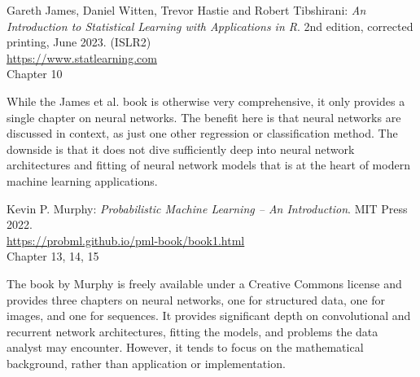 \begin{resourcebox}
Gareth James, Daniel Witten, Trevor Hastie and Robert Tibshirani: \emph{An Introduction to Statistical Learning with Applications in R}. 2nd edition, corrected printing, June 2023. (ISLR2) \\

\small\url{https://www.statlearning.com}\normalsize \\

Chapter 10
\end{resourcebox}

While the James et al. book is otherwise very comprehensive, it only provides a single chapter on neural networks. The benefit here is that neural networks are discussed in context, as just one other regression or classification method. The downside is that it does not dive sufficiently deep into neural network architectures and fitting of neural network models that is at the heart of modern machine learning applications.

\begin{resourcebox}
Kevin P. Murphy: \emph{Probabilistic Machine Learning -- An Introduction}. MIT Press 2022. \\

\small\url{https://probml.github.io/pml-book/book1.html}\normalsize \\

Chapter 13, 14, 15
\end{resourcebox}

The book by Murphy is freely available under a Creative Commons license and provides three chapters on neural networks, one for structured data, one for images, and one for sequences. It provides significant depth on convolutional and recurrent network architectures, fitting the models, and problems the data analyst may encounter. However, it tends to focus on the mathematical background, rather than application or implementation.

